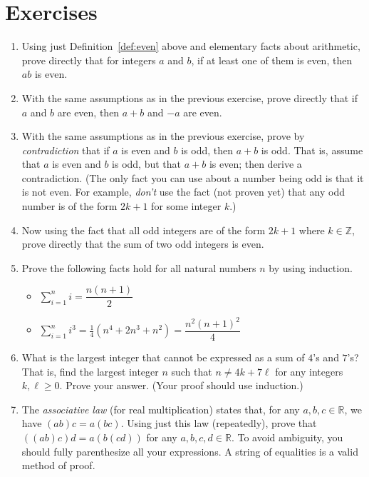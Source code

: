 \documentclass[11pt]{article}
\newcommand{\ints}{\mathbb{Z}}
\newcommand{\reals}{\mathbb{R}}
\theoremstyle{plain}
\theoremstyle{definition}
\begin{document}
\section*{Exercises}
\begin{enumerate}
\item
Using just Definition~\ref{def:even} above and elementary facts about
arithmetic, prove directly that for integers $a$ and $b$, if at least
one of them is even, then $ab$ is even.
\item
With the same assumptions as in the previous exercise, prove directly
that if $a$ and $b$ are even, then $a+b$ and $-a$ are even.
\item
With the same assumptions as in the previous exercise, prove by
\emph{contradiction} that if $a$ is even and $b$ is odd, then $a+b$ is
odd.  That is, assume that $a$ is even and $b$ is odd, but that $a+b$
is even; then derive a contradiction.  (The only fact you can use
about a number being odd is that it is not even.  For example,
\emph{don't} use the fact (not proven yet) that any odd number is of
the form $2k+1$ for some integer $k$.)
\item
Now using the fact that all odd integers are of the form $2k+1$ where
$k\in\ints$, prove directly that the sum of two odd integers is even.
\item
Prove the following facts hold for all natural numbers $n$ by using induction.
\begin{itemize}
  \item $\sum\limits_{i=1}^n i = \dfrac{n(n+1)}{2}$
  \item $\sum\limits_{i=1}^n i^3 = \frac{1}{4}(n^4 + 2n^3 + n^2) = \dfrac{n^2{(n+1)}^2}{4}$
 \end{itemize}
\item
What is the largest integer that cannot be expressed as a sum of
$4$'s and $7$'s?  That is, find the largest integer $n$ such that $n \ne
4k+7\ell$ for any integers $k,\ell \ge 0$.  Prove your answer.  (Your
proof should use induction.)
\item
The \emph{associative law} (for real multiplication) states that, for any $a,b,c\in \reals$, we have $(ab)c = a(bc)$.  Using just this law (repeatedly), prove that $((ab)c)d = a(b(cd))$ for any $a,b,c,d\in\reals$.  To avoid ambiguity, you should fully parenthesize all your expressions.  A string of equalities is a valid method of proof.
\end{enumerate}
\end{document}
